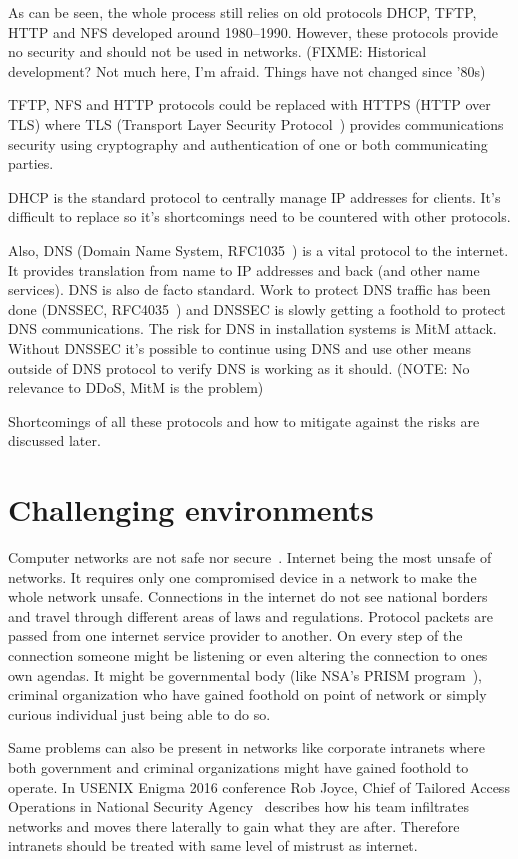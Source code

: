 As can be seen, the whole process still relies on old protocols DHCP,
TFTP, HTTP and NFS developed around 1980--1990. However, these
protocols provide no security and should not be used in
networks. (FIXME: Historical development? Not much here, I'm
afraid. Things have not changed since '80s)

TFTP, NFS and HTTP protocols could be replaced with HTTPS (HTTP over
TLS) where TLS (Transport Layer Security Protocol~\cite{RFC5246})
provides communications security using cryptography and authentication
of one or both communicating parties.

DHCP is the standard protocol to centrally manage IP addresses for
clients. It's difficult to replace so it's shortcomings need to be
countered with other protocols.

Also, DNS (Domain Name System, RFC1035~\cite{rfc1035}) is a vital
protocol to the internet. It provides translation from name to IP
addresses and back (and other name services). DNS is also de facto
standard. Work to protect DNS traffic has been done (DNSSEC,
RFC4035~\cite{rfc4035}) and DNSSEC is slowly getting a foothold to
protect DNS communications. The risk for DNS in installation systems
is MitM attack. Without DNSSEC it's possible to continue using DNS and
use other means outside of DNS protocol to verify DNS is working as it
should. (NOTE: No relevance to DDoS, MitM is the problem)

Shortcomings of all these protocols and how to mitigate against the
risks are discussed later.

\section{Challenging environments}

Computer networks are not safe nor secure~\cite{beyondcorp}. Internet
being the most unsafe of networks. It requires only one compromised
device in a network to make the whole network unsafe. Connections in
the internet do not see national borders and travel through different
areas of laws and regulations. Protocol packets are passed from one
internet service provider to another. On every step of the connection
someone might be listening or even altering the connection to ones own
agendas. It might be governmental body (like NSA's PRISM
program~\cite{nsa-prism}), criminal organization who have gained
foothold on point of network or simply curious individual just being
able to do so.

Same problems can also be present in networks like corporate intranets
where both government and criminal organizations might have gained
foothold to operate. In USENIX Enigma 2016 conference Rob Joyce, Chief
of Tailored Access Operations in National Security
Agency~\cite{nsa-tao} describes how his team infiltrates networks and
moves there laterally to gain what they are after. Therefore intranets
should be treated with same level of mistrust as internet.


